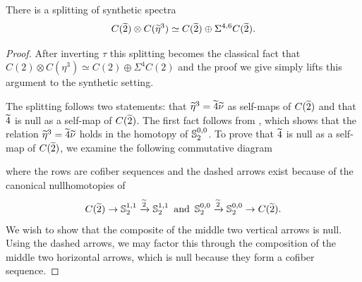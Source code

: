 \begin{lem}\label{lemm:eta-splitting}
    There is a splitting of synthetic spectra
    \[C(\wt{2}) \otimes C(\wt{\eta}^3) \simeq C(\wt{2}) \oplus \Sigma^{4,6} C(\wt{2}).\]
\end{lem}

\begin{proof}
  After inverting $\tau$ this splitting becomes the classical fact that
  $ C(2) \otimes C(\eta^3) \simeq C(2) \oplus \Sigma^{4} C(2) $
  and the proof we give simply lifts this argument to the synthetic setting.
  
  The splitting follows two statements:
  that $\wt{\eta}^3 = \wt{4} \wt{\nu}$ as self-maps of $C(\wt{2})$ and
  that $\wt{4}$ is null as a self-map of $C(\wt{2})$.
  The first fact follows from , which shows that the relation $\wt{\eta}^3 = \wt{4} \wt{\nu}$ holds in the homotopy of $\operatorname{\mathbb{S}}^{0,0} _2$.
  To prove that $\wt{4}$ is null as a self-map of $C(\wt{2})$, we examine the following commutative diagram
  
  \begin{center}
  \end{center}
  where the rows are cofiber sequences and the dashed arrows exist because of the canonical nullhomotopies of \[C(\wt{2}) \to \Ss^{1,1}_2 \xrightarrow{\wt{2}} \Ss^{1,1}_2 \text{ and } \Ss^{0,0}_2 \xrightarrow{\wt{2}} \Ss^{0,0}_2 \to C(\wt{2}).\]
    We wish to show that the composite of the middle two vertical arrows is null. Using the dashed arrows, we may factor this through the composition of the middle two horizontal arrows, which is null because they form a cofiber sequence.
\end{proof}

